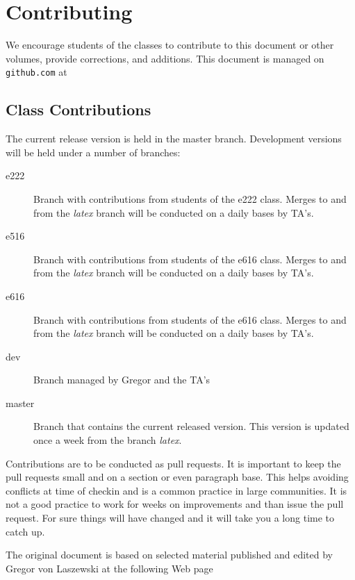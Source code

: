 
\section{Contributing}

We encourage students of the classes to contribute to this document or
other volumes, provide corrections, and additions. This document is
managed on \verb|github.com| at


\subsection{Class Contributions}

The current release version is held in the master branch.
Development versions will be held under a number of branches:

\begin{description}
\item[e222] Branch with contributions from students of the e222
  class. Merges to and from the \textit{latex} branch will be conducted
  on a daily bases by TA's.
\item[e516] Branch with contributions from students of the e616
  class. Merges to and from the \textit{latex} branch will be conducted
  on a daily bases by TA's.
\item[e616] Branch with contributions from students of the e616
  class. Merges to and from the \textit{latex} branch will be conducted
  on a daily bases by TA's.
\item[dev] Branch managed by Gregor and the TA's
\item[master] Branch that contains the current released version. This
  version is updated once a week from the branch \textit{latex}.
\end{description}

Contributions are to be conducted as pull requests. It is important to
keep the pull requests small and on a section or even paragraph
base. This helps avoiding conflicts at time of checkin and is a common
practice in large communities. It is not a good practice to work for
weeks on improvements and than issue the pull request. For sure things
will have changed and it will take you a long time to catch up.

The original document is based on selected material published and edited by Gregor von
Laszewski at the following Web page

